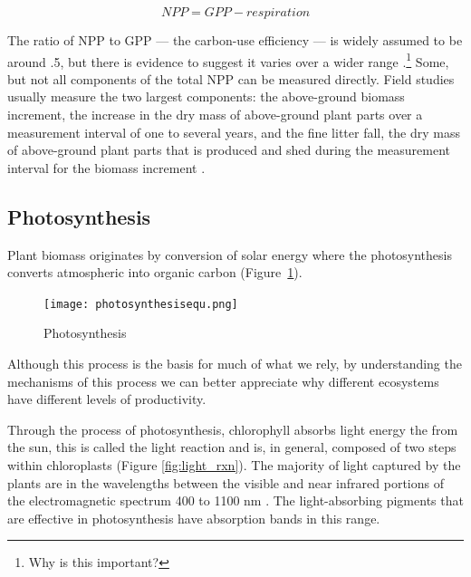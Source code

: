 \begin{equation}
		NPP = GPP - respiration
\end{equation}

The ratio of NPP to GPP --- the carbon-use efficiency --- is widely assumed to be around .5, but there is evidence to suggest it varies over a wider range \citep{delucia2007forest}.\footnote{Why is this important?} Some, but not all components of the total NPP can be measured directly. Field studies usually measure the two largest components: the above-ground biomass increment, the increase in the dry mass of above-ground plant parts over a measurement interval of one to several years, and the fine litter fall, the dry mass of above-ground plant parts that is produced and shed during the measurement interval for the biomass increment \citep{ruimy1996turc}. 
  
\subsection{Photosynthesis}


Plant biomass originates by conversion of solar energy where the photosynthesis converts atmospheric \CO into organic carbon (Figure~\ref{fig:photosynthesis}).
 
   \begin{figure}[ht]
    \centering
        \texttt{[image: photosynthesisequ.png]}
				\caption{Photosynthesis}
				\label{fig:photosynthesis}
    \end{figure}
		
Although this process is the basis for much of what we rely, by understanding the mechanisms of this process we can better appreciate why different ecosystems have different levels of productivity. 


Through the process of \gls{photosynthesis}, chlorophyll absorbs light energy the from the sun, this is called the light reaction and is, in general, composed of two steps within \gls{chloroplasts} (Figure \ref{fig:light_rxn}). The majority of light captured by the plants are in the wavelengths between the visible and near infrared portions of the electromagnetic spectrum 400 to 1100 nm \citep{stenberg2010visible}. The light-absorbing pigments that are effective in photosynthesis have absorption bands in this range.

